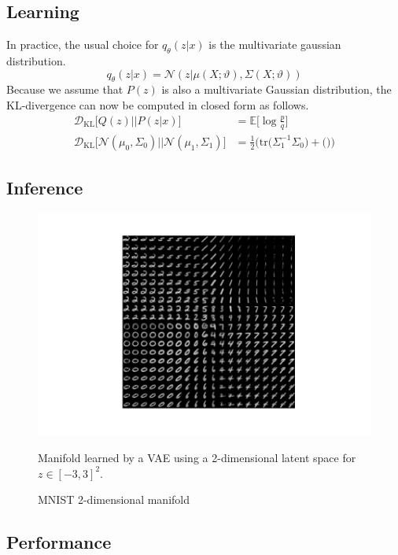 \subsection{Learning}
\label{sub:vae_learning}
In practice, the usual choice for $q_\theta(z|x)$ is the multivariate gaussian distribution.
$$
q_\theta(z|x) = \mathcal{N}(z|\mu(X;\vartheta), \Sigma(X;\vartheta))
$$
Because we assume that $P(z)$ is also a multivariate Gaussian distribution, the KL-divergence can now be computed in closed form as follows\cite{derivations:2007}.
\begin{align*}
  \mathcal{D}_{\mathrm{KL}}\big[Q(z) || P(z|x)\big] &= \mathbb{E}\big[\log \frac{p}{q}\big]\\
  \mathcal{D}_{\mathrm{KL}}\big[\mathcal{N}(\mu_0,\Sigma_0) || \mathcal{N}(\mu_1,\Sigma_1)\big]
  &= \frac{1}{2} \big(\mathrm{tr}\big(\Sigma_1^{-1}\Sigma_0\big) + \big(\big)\big)
\end{align*}


\subsection{Inference}
\label{sub:vae_inference}
\begin{figure}[htb]
\centering
\includegraphics{media/manifold.pdf}
  \caption{MNIST 2-dimensional manifold}\label{fig:vae_manifold}
  \medskip
  \small
  Manifold learned by a VAE using a 2-dimensional latent space for $z \in [-3,3]^2$.
\end{figure}

\subsection{Performance}
\label{sub:vae_performance}

